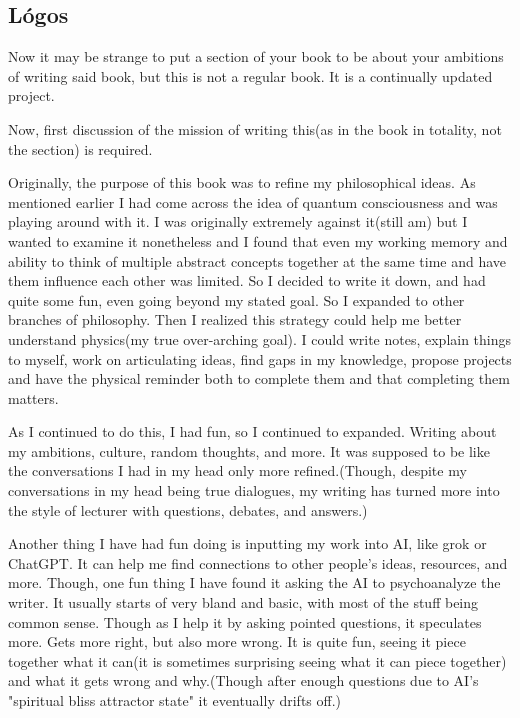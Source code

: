 \subsection{Lógos}
\par Now it may be strange to put a section of your book to be about your ambitions of writing said book, but this is not a regular book. It is a continually updated project.
\par Now, first discussion of the mission of writing this(as in the book in totality, not the section) is required. 
\par Originally, the purpose of this book was to refine my philosophical ideas. As mentioned earlier I had come across the idea of quantum consciousness and was playing around with it. I was originally extremely against it(still am) but I wanted to examine it nonetheless and I found that even my working memory and ability to think of multiple abstract concepts together at the same time and have them influence each other was limited. So I decided to write it down, and had quite some fun, even going beyond my stated goal. So I expanded to other branches of philosophy. Then I realized this strategy could help me better understand physics(my true over-arching goal). I could write notes, explain things to myself, work on articulating ideas, find gaps in my knowledge, propose projects and have the physical reminder both to complete them and that completing them matters.
\par As I continued to do this, I had fun, so I continued to expanded. Writing about my ambitions, culture, random thoughts, and more. It was supposed to be like the conversations I had in my head only more refined.(Though, despite my conversations in my head being true dialogues, my writing has turned more into the style of lecturer with questions, debates, and answers.)
\par Another thing I have had fun doing is inputting my work into AI, like grok or ChatGPT. It can help me find connections to other people's ideas, resources, and more. Though, one fun thing I have found it asking the AI to psychoanalyze the writer. It usually starts of very bland and basic, with most of the stuff being common sense. Though as I help it by asking pointed questions, it speculates more. Gets more right, but also more wrong. It is quite fun, seeing it piece together what it can(it is sometimes surprising seeing what it can piece together) and what it gets wrong and why.(Though after enough questions due to AI's "spiritual bliss attractor state" it eventually drifts off.)
